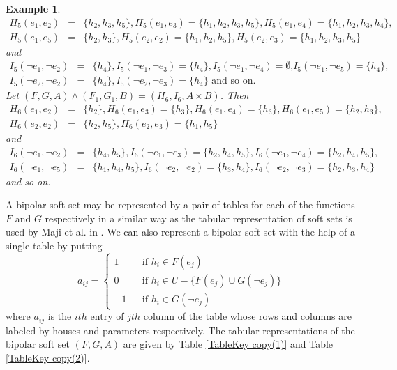 \documentclass{amsart}
\theoremstyle{plain}
\newtheorem{example}{Example}
\numberwithin{equation}{section}
\begin{document}
\begin{example}
\begin{eqnarray*}
H_{5}(e_{1},e_{2})
&=&\{h_{2},h_{3},h_{5}\},H_{5}(e_{1},e_{3})=\{h_{1},h_{2},h_{3},h_{5}\},H_{5}(e_{1},e_{4})=\{h_{1},h_{2},h_{3},h_{4}\}, \\
H_{5}(e_{1},e_{5})
&=&\{h_{2},h_{3}\},H_{5}(e_{2},e_{2})=\{h_{1},h_{2},h_{5}\},H_{5}(e_{2},e_{3})=\{h_{1},h_{2},h_{3},h_{5}\}
\end{eqnarray*}
and\begin{eqnarray*}
I_{5}(\lnot e_{1},\lnot e_{2}) &=&\{h_{4}\},I_{5}(\lnot e_{1},\lnot
e_{3})=\{h_{4}\},I_{5}(\lnot e_{1},\lnot e_{4})=\emptyset \text{,}I_{5}(\lnot e_{1},\lnot e_{5})=\{h_{4}\}, \\
I_{5}(\lnot e_{2},\lnot e_{2}) &=&\{h_{4}\},I_{5}(\lnot e_{2},\lnot
e_{3})=\{h_{4}\}\text{ \ and so on.}
\end{eqnarray*}Let $(F,G,A)\wedge (F_{1},G_{1},B)=(H_{6},I_{6},A\times B)$. Then\begin{eqnarray*}
H_{6}(e_{1},e_{2})
&=&\{h_{2}\},H_{6}(e_{1},e_{3})=\{h_{3}\},H_{6}(e_{1},e_{4})=\{h_{3}\},H_{6}(e_{1},e_{5})=\{h_{2},h_{3}\}, \\
H_{6}(e_{2},e_{2}) &=&\{h_{2},h_{5}\},H_{6}(e_{2},e_{3})=\{h_{1},h_{5}\}
\end{eqnarray*}
and\begin{eqnarray*}
I_{6}(\lnot e_{1},\lnot e_{2}) &=&\{h_{4},h_{5}\},I_{6}(\lnot e_{1},\lnot
e_{3})=\{h_{2},h_{4},h_{5}\},I_{6}(\lnot e_{1},\lnot
e_{4})=\{h_{2},h_{4},h_{5}\}, \\
I_{6}(\lnot e_{1},\lnot e_{5}) &=&\{h_{1},h_{4},h_{5}\},I_{6}(\lnot
e_{2},\lnot e_{2})=\{h_{3},h_{4}\},I_{6}(\lnot e_{2},\lnot
e_{3})=\{h_{2},h_{3},h_{4}\}
\end{eqnarray*}and so on.
\end{example}

\label{tbldesc1}A bipolar soft set may be represented by a pair of tables
for each of the functions $F$ and $G$ respectively in a similar way as the
tabular representation of soft sets is used by Maji et al. in \cite{[2]}. We
can also represent a bipolar soft set with the help of a single table by
putting\begin{equation*}
a_{ij}=\left\{ 
\begin{array}{rll}
1 &  & \text{if }h_{i}\in F(e_{j}) \\ 
0 &  & \text{if }h_{i}\in U-\{F(e_{j})\cup G(\lnot e_{j})\} \\ 
-1 &  & \text{if }h_{i}\in G(\lnot e_{j})\end{array}\right. 
\end{equation*}where $a_{ij}$ is the $ith$ entry of $jth$ column of the table whose rows
and columns are labeled by houses and parameters respectively. The tabular
representations of the bipolar soft set $(F,G,A)$ are given by Table \ref{TableKey copy(1)} and Table \ref{TableKey copy(2)}.
\end{document}
